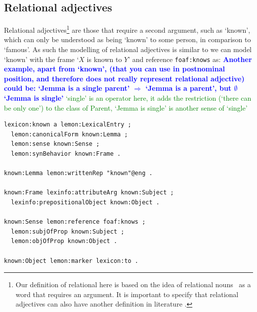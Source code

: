 \documentclass[11pt]{article}
\begin{document}

\subsection{Relational adjectives}

Relational adjectives\footnote{Our definition of relational here is based on the idea of
    relational nouns~\cite{de1988interpretation} as a word that requires an argument. 
    It is important to specify that relational adjectives can also have another definition in literature \cite{morzycki2013nonscales}.}
are those that require a second argument, such as `known', which
can only be understood as being `known' to some person, in comparison to `famous'.
As such the modelling of relational adjectives is similar to we can model `known' with the frame `$X$ is known to $Y$' and
reference {\tt foaf:knows} as:
\textbf{\textcolor{blue}{Another example, apart from `known', (that you can use in postnominal position, and therefore does not really represent relational adjective) could be: `Jemma is a single parent' $\Rightarrow$ `Jemma is a parent', but $\emptyset$ `Jemma is single'}}
\textcolor{green}{`single' is an operator here, it adds the restriction (`there can be only one') to the class of Parent, `Jemma is single' is another sense of `single'}


\begin{small}\begin{verbatim}
lexicon:known a lemon:LexicalEntry ;
  lemon:canonicalForm known:Lemma ;
  lemon:sense known:Sense ;
  lemon:synBehavior known:Frame .

known:Lemma lemon:writtenRep "known"@eng .

known:Frame lexinfo:attributeArg known:Subject ;
  lexinfo:prepositionalObject known:Object .

known:Sense lemon:reference foaf:knows ;
  lemon:subjOfProp known:Subject ;
  lemon:objOfProp known:Object .
	
known:Object lemon:marker lexicon:to .
\end{verbatim}\end{small}
\end{document}
